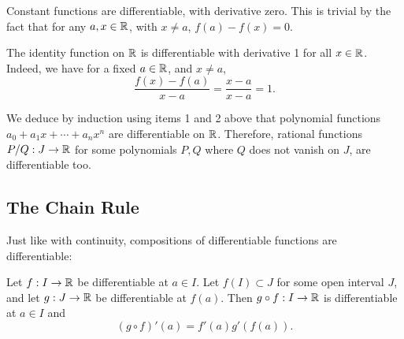 \documentclass[../analysis1.tex]{subfiles}
\begin{document}
\begin{example}
    Constant functions are differentiable, with derivative zero. This is trivial by the fact that for any $a,x\in \mathbb{R}$, with $x\ne a$, $f(a)-f(x)=0$.

    The identity function on $\mathbb{R}$ is differentiable with derivative 1 for all $x\in \mathbb{R}$. Indeed, we have for a fixed $a\in \mathbb{R}$, and $x\ne a$,
    \[\frac{f(x)-f(a)}{x-a}=\frac{x-a}{x-a}=1.\]

    We deduce by induction using items 1 and 2 above that polynomial functions $a_0+a_1x+\cdots+a_nx^n$ are differentiable on $\mathbb{R}$. Therefore, rational functions $P/Q:J\to\mathbb{R}$ for some polynomials $P,Q$ where $Q$ does not vanish on $J$, are differentiable too.
\end{example}

\subsection{The Chain Rule}

Just like with continuity, compositions of differentiable functions are differentiable:
\begin{theorem}
    \begin{shaded*}
        Let $f:I\to\mathbb{R}$ be differentiable at $a\in I$. Let $f(I)\subset J$ for some open interval $J$, and let $g:J\to\mathbb{R}$ be differentiable at $f(a)$. Then $g\circ f : I\to\mathbb{R}$ is differentiable at $a\in I$ and
        \[(g\circ f)'(a)=f'(a)g'(f(a)).\]
    \end{shaded*}
\end{theorem}
\end{document}
